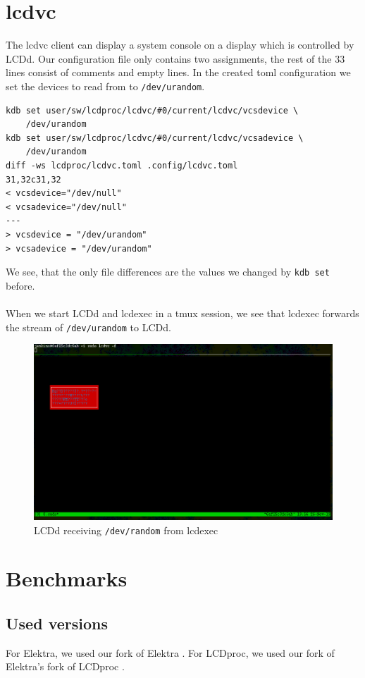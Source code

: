 \documentclass[draft,final]{vutinfth} %
\begin{document}
\section{lcdvc}
The lcdvc client can display a system console on a display which is controlled by LCDd.
Our configuration file only contains two assignments, the rest of the 33 lines consist of comments and empty lines.
In the created \acrshort{toml} configuration we set the devices to read from to \texttt{/dev/urandom}.
\begin{Verbatim}[frame=single, fontsize=\small]
kdb set user/sw/lcdproc/lcdvc/#0/current/lcdvc/vcsdevice \
    /dev/urandom
kdb set user/sw/lcdproc/lcdvc/#0/current/lcdvc/vcsadevice \
    /dev/urandom
diff -ws lcdproc/lcdvc.toml .config/lcdvc.toml
31,32c31,32
< vcsdevice="/dev/null"
< vcsadevice="/dev/null"
---
> vcsdevice = "/dev/urandom"
> vcsadevice = "/dev/urandom"
\end{Verbatim}
We see, that the only file differences are the values we changed by \texttt{kdb set} before.
\\\\
When we start LCDd and lcdexec in a \acrshort{tmux} session, we see that lcdexec forwards the stream of \texttt{/dev/urandom} to LCDd.
\FloatBarrier
\begin{figure}[h!]
	\centering
		\includegraphics[width=\linewidth]{graphics/lcdvc.png}
  \caption{LCDd receiving \texttt{/dev/random} from lcdexec}
\label{fig:lcdvc}
\end{figure}
\FloatBarrier

\section{Benchmarks}

\subsection{Used versions}
For Elektra, we used our fork of Elektra \cite{bauhausforkelektra}.
For LCDproc, we used our fork of Elektra's fork of LCDproc \cite{bauhausforklcdproc}.
\end{document}
